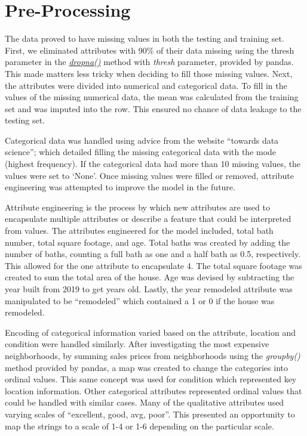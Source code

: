 \documentclass[letterpaper,10pt]{article}
\begin{document}
\section{Pre-Processing}
The data proved to have missing values in both the testing and training set. First, we eliminated attributes with 90\% of their data missing using the thresh parameter in the \href{https://towardsdatascience.com/how-to-handle-missing-data-8646b18db0d4}{\it dropna()} method with {\it thresh} parameter, provided by pandas. This made matters less tricky when deciding to fill those missing values. Next, the attributes were divided into numerical and categorical data. To fill in the values of the missing numerical data, the mean was calculated from the training set and was imputed into the row. This ensured no chance of data leakage to the testing set.\par
Categorical data was handled using advice from the website “towards data science”; which detailed filling the missing categorical data with the mode (highest frequency). If the categorical data had more than 10 missing values, the values were set to ‘None’. Once missing values were filled or removed, attribute engineering was attempted to improve the model in the future. \par
Attribute engineering is the process by which new attributes are used to encapsulate multiple attributes or describe a feature that could be interpreted from values. The attributes engineered for the model included, total bath number, total square footage, and age. Total baths was created by adding the number of baths, counting a full bath as one and a half bath as 0.5, respectively. This allowed for the one attribute to encapsulate 4. The total square footage was created to sum the total area of the house. Age was devised by subtracting the year built from 2019 to get years old. Lastly, the year remodeled attribute was manipulated to be “remodeled” which contained a 1 or 0 if the house was remodeled.\par
Encoding of categorical information varied based on the attribute, location and condition were handled similarly. After investigating the most expensive neighborhoods, by summing sales prices from neighborhoods using the {\it groupby()} method provided by pandas, a map was created to change the categories into ordinal values. This same concept was used for condition which represented key location information. Other categorical attributes represented ordinal values that could be handled with similar cases. Many of the qualitative attributes used varying scales of “excellent, good, avg, poor”. This presented an opportunity to  map the strings to a scale of 1-4 or 1-6 depending on the particular scale. \par
\end{document}
